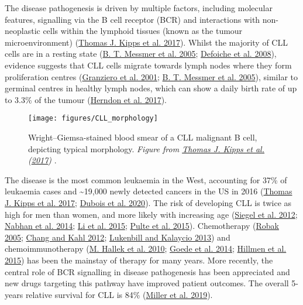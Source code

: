 \documentclass[11pt, a4paper, twosided]{book}
\begin{document}
The disease pathogenesis is driven by multiple factors, including molecular features, signalling via the B cell receptor (BCR) and interactions with non-neoplastic cells within the lymphoid tissues (known as the tumour microenvironment) (\protect\hyperlink{ref-Kipps2017}{Thomas J. Kipps et al. 2017}). Whilst the majority of CLL cells are in a resting state (\protect\hyperlink{ref-Messmer2005}{B. T. Messmer et al. 2005}; \protect\hyperlink{ref-Defoiche2008}{Defoiche et al. 2008}), evidence suggests that CLL cells migrate towards lymph nodes where they form proliferation centres (\protect\hyperlink{ref-Granziero2001}{Granziero et al. 2001}; \protect\hyperlink{ref-Messmer2005}{B. T. Messmer et al. 2005}), similar to germinal centres in healthy lymph nodes, which can show a daily birth rate of up to 3.3\% of the tumour (\protect\hyperlink{ref-Herndon2017}{Herndon et al. 2017}).


\begin{figure}

{\centering \texttt{[image: figures/CLL\_morphology]} 

}

\caption{Wright--Giemsa-stained blood smear of a CLL malignant B cell, depicting typical morphology. \emph{Figure from \protect\hyperlink{ref-Kipps2017}{Thomas J. Kipps et al.} (\protect\hyperlink{ref-Kipps2017}{2017}) }.}\label{fig:CLLmorphology}
\end{figure}
The disease is the most common leukaemia in the West, accounting for 37\% of leukaemia cases and \textasciitilde19,000 newly detected cancers in the US in 2016 (\protect\hyperlink{ref-Kipps2017}{Thomas J. Kipps et al. 2017}; \protect\hyperlink{ref-Dubois2020}{Dubois et al. 2020}). The risk of developing CLL is twice as high for men than women, and more likely with increasing age (\protect\hyperlink{ref-Siegel2012}{Siegel et al. 2012}; \protect\hyperlink{ref-Nabhan2014}{Nabhan et al. 2014}; \protect\hyperlink{ref-Li2015}{Li et al. 2015}; \protect\hyperlink{ref-Pulte2015}{Pulte et al. 2015}). Chemotherapy (\protect\hyperlink{ref-Robak2005}{Robak 2005}; \protect\hyperlink{ref-Chang2012}{Chang and Kahl 2012}; \protect\hyperlink{ref-Lukenbill2013}{Lukenbill and Kalaycio 2013}) and chemoimmunotherapy (\protect\hyperlink{ref-Hallek2010}{M. Hallek et al. 2010}; \protect\hyperlink{ref-Goede2014}{Goede et al. 2014}; \protect\hyperlink{ref-Hillmen2015}{Hillmen et al. 2015}) has been the mainstay of therapy for many years. More recently, the central role of BCR signalling in disease pathogenesis has been appreciated and new drugs targeting this pathway have improved patient outcomes. The overall 5-years relative survival for CLL is 84\% (\protect\hyperlink{ref-Miller2019}{Miller et al. 2019}).
\end{document}
